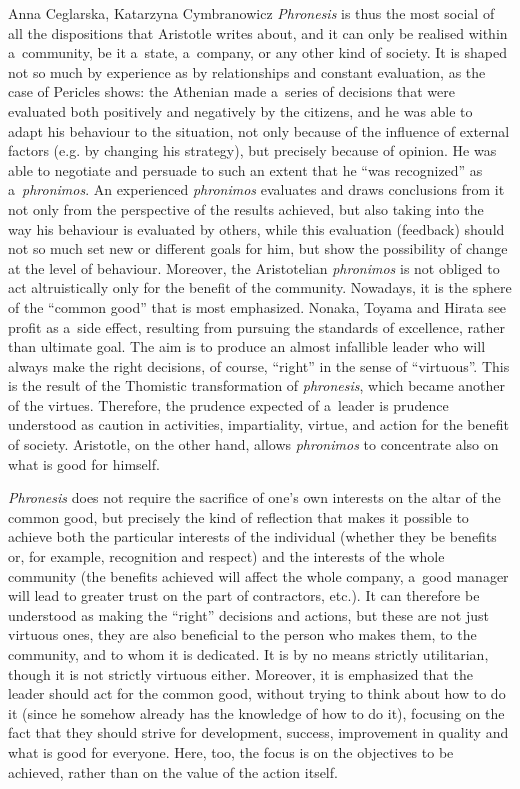 \begin{artengenv2auth}{Anna Ceglarska, Katarzyna Cymbranowicz}
\textit{Phronesis} is thus the most social of all the dispositions that Aristotle writes about, and it can only be realised within a~community, be it a~state, a~company, or any other kind of society. It is shaped not so much by experience as by relationships and constant evaluation, as the case of Pericles shows: the Athenian made a~series of decisions that were evaluated both positively and negatively by the citizens, and he was able to adapt his behaviour to the situation, not only because of the influence of external factors (e.g. by changing his strategy), but precisely because of opinion. He was able to negotiate and persuade to such an extent that he ``was recognized'' as a~\textit{phronimos}. An experienced \textit{phronimos} evaluates and draws conclusions from it not only from the perspective of the results achieved, but also taking into the way his behaviour is evaluated by others, while this evaluation (feedback) should not so much set new or different goals for him, but show the possibility of change at the level of behaviour. Moreover, the Aristotelian \textit{phronimos} is not obliged to act altruistically only for the benefit of the community. Nowadays, it is the sphere of the ``common good'' that is most emphasized. Nonaka, Toyama and Hirata see profit as a~side effect, resulting from pursuing the standards of excellence, rather than ultimate goal. The aim is to produce an almost infallible leader who will always make the right decisions, of course, ``right'' in the sense of ``virtuous''. This is the result of the Thomistic transformation of \textit{phronesis}, which became another of the virtues. Therefore, the prudence expected of a~leader is prudence understood as caution in activities, impartiality, virtue, and action for the benefit of society. Aristotle, on the other hand, allows \textit{phronimos} to concentrate also on what is good for himself.



\textit{Phronesis} does not require the sacrifice of one's own interests on the altar of the common good, but precisely the kind of reflection that makes it possible to achieve both the particular interests of the individual (whether they be benefits or, for example, recognition and respect) and the interests of the whole community (the benefits achieved will affect the whole company, a~good manager will lead to greater trust on the part of contractors, etc.). It can therefore be understood as making the ``right'' decisions and actions, but these are not just virtuous ones, they are also beneficial to the person who makes them, to the community, and to whom it is dedicated. It is by no means strictly utilitarian, though it is not strictly virtuous either. Moreover, it is emphasized that the leader should act for the common good, without trying to think about how to do it (since he somehow already has the knowledge of how to do it), focusing on the fact that they should strive for development, success, improvement in quality and what is good for everyone. Here, too, the focus is on the objectives to be achieved, rather than on the value of the action itself.




\end{artengenv2auth}
